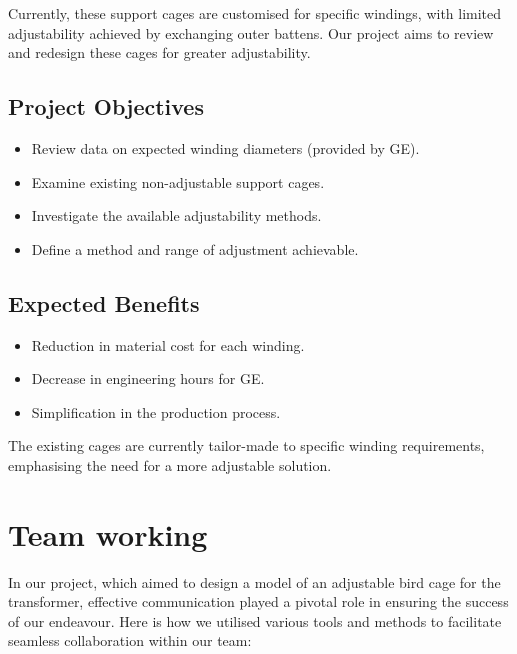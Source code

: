 \documentclass[a4paper,10pt]{article}
\begin{document}
Currently, these support cages are customised for specific windings, with limited adjustability achieved by exchanging outer battens. Our project aims to review and redesign these cages for greater adjustability.

\subsection{Project Objectives}
\begin{itemize}
  \item Review data on expected winding diameters (provided by \gls{GE}).
  \item Examine existing non-adjustable support cages.
  \item Investigate the available adjustability methods.
  \item Define a method and range of adjustment achievable.
\end{itemize}

\subsection{Expected Benefits}
\begin{itemize}
  \item Reduction in material cost for each winding.
  \item Decrease in engineering hours for \gls{GE}.
  \item Simplification in the production process.
\end{itemize}

The existing cages are currently tailor-made to specific winding requirements, emphasising the need for a more adjustable solution.



\section{Team working}
In our project, which aimed to design a model of an adjustable bird cage for the transformer, effective communication played a pivotal role in ensuring the success of our endeavour. Here is how we utilised various tools and methods to facilitate seamless collaboration within our team:
\end{document}
